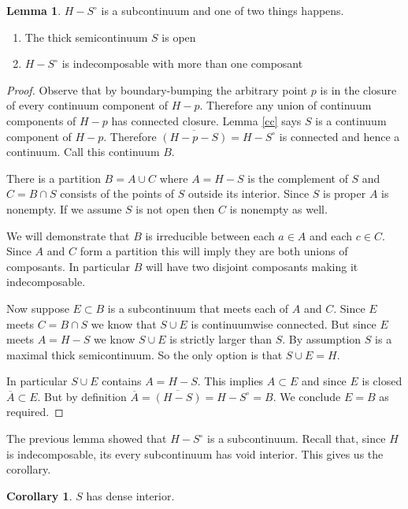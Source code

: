 \documentclass[12pt]{article}
\theoremstyle{plain}
\theoremstyle{definition}
\newtheorem{lemma}[theorem]{Lemma}
\newtheorem{corollary}[theorem]{Corollary}
\newcommand{\0}{\ensuremath{\varnothing}}
\begin{document}
	
	\begin{lemma} \label{compl} $H - S^\circ$ is a subcontinuum and one of two things happens. 
		\begin{enumerate} 
			\item The thick semicontinuum $S$ is open
			\item $H-S^\circ$ is indecomposable with more than one composant
		\end{enumerate}
	\end{lemma}
	\begin{proof}
		Observe that by boundary-bumping the arbitrary point $p$ is in the closure of every continuum component of $H-p$. 
		Therefore any union of continuum components of $H-p$ has connected closure. 
		Lemma \ref{cc} says $S$ is a continuum component of $H-p$. 
		Therefore $\overline {(H-p-S)} = H - S^\circ$ is connected and hence a continuum. Call this continuum $B$.
		
		There is a partition $B = A \cup C$ where $A = H-S $ is the complement of $S$ and $C = B \cap S$ consists of the points of $S$ outside its interior. 
		Since $S$ is proper $A$ is nonempty. If we assume $S$ is not open then $C$ is nonempty as well.
		
		We will demonstrate that $B$ is irreducible between each $a \in A$ and each $c \in C$. 
		Since $A$ and $C$ form a partition this will imply they are both unions of composants. 
		In particular $B$ will have two disjoint composants making it indecomposable.
		
		Now suppose $E \subset B$ is a subcontinuum that meets each of $A$ and $C$. 
		Since $E$ meets $C = B \cap S$ we know that $S \cup E$ is continuumwise connected. 
		But since $E$ meets $A = H-S$ we know $S \cup E$ is strictly larger than $S$. 
		By assumption $S$ is a maximal thick semicontinuum. So the only option is that $S \cup E = H$. 
		
		In particular $S \cup E$ contains $A = H-S$. 
		This implies $A \subset E$ and since $E$ is closed $\overline {A} \subset E$. But by definition $\overline {A} = \overline {(H-S)} = H-S^\circ = B$. 
		We conclude $E = B$ as required.\end{proof}
	
	The previous lemma showed that $H-S^\circ$ is a subcontinuum. 
	Recall that, since $H$ is indecomposable, its every subcontinuum has void interior. This gives us the corollary.
	
	\begin{corollary} \label{di} $S$ has dense interior.\end{corollary} 
	
\end{document}
